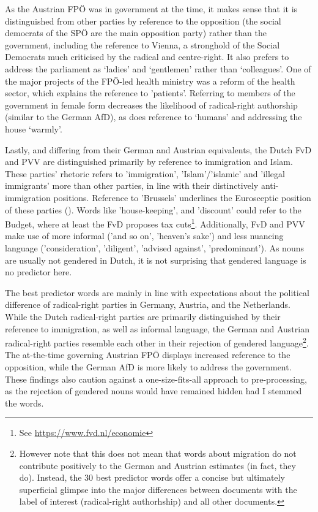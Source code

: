 \documentclass{article}
\begin{document}
As the Austrian FPÖ was in government at the time, it makes sense that it is distinguished from other parties by reference to the opposition (the social democrats of the SPÖ are the main opposition party) rather than the government, including the reference to Vienna, a stronghold of the Social Democrats much criticised by the radical and centre-right. It also prefers to address the parliament as ‘ladies’ and ‘gentlemen’ rather than ‘colleagues’. One of the major projects of the FPÖ-led health ministry was a reform of the health sector, which explains the reference to 'patients'. Referring to members of the government in female form decreases the likelihood of radical-right authorship (similar to the German AfD), as does reference to ‘humans’ and addressing the house ‘warmly’.\par

Lastly, and differing from their German and Austrian equivalents, the Dutch FvD and PVV are distinguished primarily by reference to immigration and Islam. These parties' rhetoric refers to 'immigration', 'Islam'/'islamic' and 'illegal immigrants' more than other parties, in line with their distinctively anti-immigration positions. Reference to 'Brussels' underlines the Eurosceptic position of these parties (\cite{ThePopulist2019}). Words like 'house-keeping', and 'discount' could refer to the Budget, where at least the FvD proposes tax cuts\footnote{See \url{https://www.fvd.nl/economie}}. Additionally, FvD and PVV make use of more informal ('and so on', 'heaven’s sake') and less nuancing language ('consideration', 'diligent', 'advised against', 'predominant'). As nouns are usually not gendered in Dutch, it is not surprising that gendered language is no predictor here.\par

The best predictor words are mainly in line with expectations about the political difference of radical-right parties in Germany, Austria, and the Netherlands. While the Dutch radical-right parties are primarily distinguished by their reference to immigration, as well as informal language, the German and Austrian radical-right parties resemble each other in their rejection of gendered language\footnote{However note that this does not mean that words about migration do not contribute positively to the German and Austrian estimates (in fact, they do). Instead, the 30 best predictor words offer a concise but ultimately superficial glimpse into the major differences between documents with the label of interest (radical-right authorhship) and all other documents.}. The at-the-time governing Austrian FPÖ displays increased reference to the opposition, while the German AfD is more likely to address the government. These findings also caution against a one-size-fits-all approach to pre-processing, as the rejection of gendered nouns would have remained hidden had I stemmed the words.\par
\end{document}
